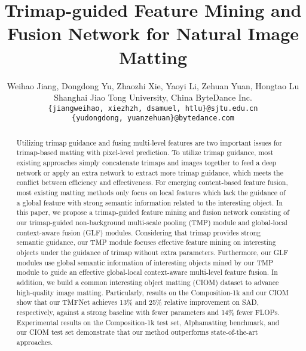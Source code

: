 \documentclass[10pt,twocolumn,letterpaper]{article}
\begin{document}
\title{Trimap-guided Feature Mining and Fusion Network for  Natural Image Matting}
\author{Weihao Jiang, Dongdong Yu, Zhaozhi Xie, Yaoyi Li, Zehuan Yuan, Hongtao Lu\\
Shanghai Jiao Tong University, China \quad 
ByteDance Inc.\\
{\tt\small \{jiangweihao, xiezhzh, dsamuel, htlu\}@sjtu.edu.cn} \\
{\tt\small \{yudongdong,  yuanzehuan\}@bytedance.com}
}
\maketitle
\let\thefootnote\relax{}
\let\thefootnote\relax{}
\begin{abstract}
   Utilizing trimap guidance and fusing multi-level features are two important issues for trimap-based matting with pixel-level prediction. To utilize trimap guidance, most existing approaches simply concatenate trimaps and images together to feed a deep network or apply an extra network to extract more trimap guidance, which meets the conflict between efficiency and effectiveness. For emerging content-based feature fusion, most existing matting methods only focus on local features which lack the guidance of a global feature with strong semantic information related to the interesting object. In this paper, we propose a trimap-guided feature mining and fusion network consisting of our trimap-guided non-background multi-scale pooling (TMP) module and global-local context-aware fusion (GLF) modules. Considering that trimap provides strong semantic guidance, our TMP module focuses effective feature mining on interesting objects under the guidance of trimap without extra parameters. Furthermore, our GLF modules use global semantic information of interesting objects mined by our TMP module to guide an effective global-local context-aware multi-level feature fusion. In addition, we build a common interesting object matting (CIOM) dataset to advance high-quality image matting. Particularly,
results on the Composition-1k and our CIOM show that our
TMFNet achieves 13\% and 25\% relative improvement on SAD,
respectively, against a strong baseline with fewer parameters
and 14\% fewer FLOPs. Experimental results on the Composition-1k test set, Alphamatting benchmark, and our CIOM test set demonstrate that our method outperforms state-of-the-art approaches. 
\end{abstract}
\end{document}
